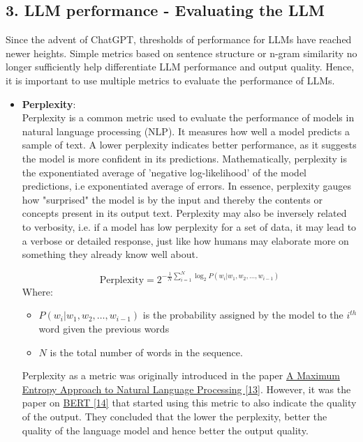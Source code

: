 \documentclass[12pt]{article}
\begin{document}
    \subsection*{3. LLM performance - Evaluating the LLM}
    Since the advent of ChatGPT, thresholds of performance for LLMs have reached newer heights. Simple metrics based on sentence structure or n-gram similarity no longer sufficiently help differentiate LLM performance and output quality. Hence, it is important to use multiple metrics to evaluate the performance of LLMs.
    \begin{itemize}
        \item \textbf{Perplexity}: \\
        Perplexity is a common metric used to evaluate the performance of models in natural language processing (NLP). It measures how well a model predicts a sample of text. A lower perplexity indicates better performance, as it suggests the model is more confident in its predictions. Mathematically, perplexity is the exponentiated average of 'negative log-likelihood' of the model predictions, i.e exponentiated average of errors. In essence, perplexity gauges how "surprised" the model is by the input and thereby the contents or concepts present in its output text.
        Perplexity may also be inversely related to verbosity, i.e. if a model has low perplexity for a set of data, it may lead to a verbose or detailed response, just like how humans may elaborate more on something they already know well about.

        \[\text{Perplexity} = 2^{-\frac{1}{N} \sum_{i=1}^{N} \log_2 P(w_i | w_1, w_2, \dots, w_{i-1})} \]
        Where:
        \begin{itemize}
            \item \textbf{\(P(w_i | w_1, w_2, \dots, w_{i-1})\)} is the probability assigned by the model to the \(i^{th}\) word given the previous words
            \item \textbf{\(N\)} is the total number of words in the sequence.
        \end{itemize}

        Perplexity as a metric was originally introduced in the paper \href{https://aclanthology.org/J96-1002.pdf}{A Maximum Entropy Approach
        to Natural Language Processing [13]}. However, it was the paper on \href{https://arxiv.org/pdf/1810.04805}{BERT [14]} that started using this metric to also indicate the quality of the output. They concluded that the lower the perplexity, better the quality of the language model and hence better the output quality.



\end{itemize}
\end{document}
